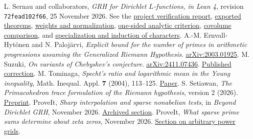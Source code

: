 \documentclass[11pt]{article}
\newcommand{\source}[2]{\href{https://github.com/lsernau/grh-lean/blob/72fead102f663d5c7a407964a13dc0cf9d977207/grh/#1}{#2}}
\begin{document}
\small
\begin{thebibliography}{9}
 L. Sernau and collaborators, \emph{GRH for Dirichlet $L$-functions, in Lean 4}, revision \texttt{72fead102f66}, 25 November 2026.
See the \source{README.md}{project verification report}, \source{src/Main.lean}{exported theorems}, \source{src/New/Reduction/Zeros/PrimeError.lean}{weights and normalization}, \source{src/New/Reduction/Zeros/Criterion.lean}{one-sided analytic criterion}, \source{src/New/Reduction/MainInequality.lean}{covolume comparison}, and \source{src/New/Reduction/OneSidedBound.lean}{specialization and induction of characters}.
 A.-M. Ernvall-Hyt\"onen and N. Paloj\"arvi, \emph{Explicit bound for the number of primes in arithmetic progressions assuming the Generalized Riemann Hypothesis}. \href{https://arxiv.org/abs/2003.01925}{arXiv:2003.01925}.
 M. Suzuki, \emph{On variants of Chebyshev's conjecture}. \href{https://arxiv.org/abs/2411.07436}{arXiv:2411.07436}. \href{https://doi.org/10.1007/s11139-025-01289-y}{Published correction}.
 M. Tominaga, \emph{Specht's ratio and logarithmic mean in the Young inequality}, Math. Inequal. Appl. \textbf{7} (2004), 113--125. \href{https://files.ele-math.com/articles/mia-07-13.pdf}{Paper}.
 S. Setiawan, \emph{The Primacohedron trace formulation of the Riemann hypothesis}, version 2 (2026). \href{https://www.preprints.org/manuscript/202611.0738}{Preprint}.
 ProveIt, \emph{Sharp interpolation and sparse nonabelian tests}, in \emph{Beyond Dirichlet GRH}, November 2026. \href{https://github.com/VladimirReshetnikov/ProveIt/blob/1f20b04e3f8d78f16d1a873547d90554e46e40bf/Analysis/GeneralizedRiemannHypothesis/Research/grh_method_transfers_2026-11-25/report/sparse_sampling.tex}{Archived section}.
 ProveIt, \emph{What sparse prime sums determine about zeta zeros}, November 2026. \href{https://github.com/VladimirReshetnikov/ProveIt/blob/1f20b04e3f8d78f16d1a873547d90554e46e40bf/Analysis/GeneralizedRiemannHypothesis/Research/grh-torsion-and-prime-sampling/sections/powers.tex}{Section on arbitrary power grids}.
\end{thebibliography}
\end{document}
